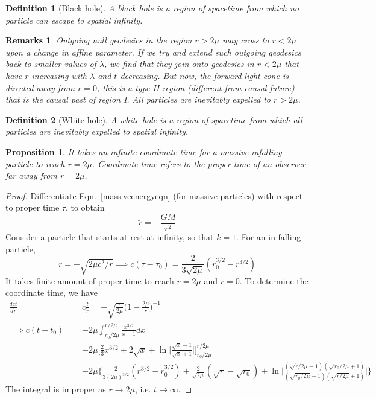 \documentclass[a4paper]{article}
\newtheorem{remarks}{Remarks}[section]
\theoremstyle{new}
\newtheorem{defi}{Definition}[section]
\newtheorem{prop}{Proposition}[section]
\begin{document}
\begin{defi}[Black hole]
A black hole is a region of spacetime from which no particle can escape to spatial infinity.
\end{defi}
\begin{remarks}
Outgoing null geodesics in the region $r>2\mu$ may cross to $r<2\mu$ upon a change in affine parameter. If we try and extend such outgoing geodesics back to smaller values of $\lambda$, we find that they join onto geodesics in $r<2\mu$ that have $r$ increasing with $\lambda$ and $t$ decreasing. But now, the forward light cone is directed away from $r=0$, this is a type II region (different from causal future) that is the causal past of region I. All particles are inevitably expelled to $r>2\mu$.
\end{remarks}
\begin{defi}[White hole]
A white hole is a region of spacetime from which all particles are inevitably expelled to spatial infinity.
\end{defi}
\begin{prop}
It takes an infinite coordinate time for a massive infalling particle to reach $r=2\mu$. Coordinate time refers to the proper time of an observer far away from $r=2\mu$.
\end{prop}
\begin{proof}
Differentiate Eqn.~\ref{massiveenergyeqn} (for massive particles) with respect to proper time $\tau$, to obtain
$$\ddot{r}=-\frac{GM}{r^2}$$
Consider a particle that starts at rest at infinity, so that $k=1$. For an in-falling particle, 
$$\dot{r}=-\sqrt{2\mu c^2/r}\implies c(\tau-\tau_0)=\frac{2}{3\sqrt{2\mu}}(r_0^{3/2}-r^{3/2})$$
It takes finite amount of proper time to reach $r=2\mu$ and $r=0$. To determine the coordinate time, we have
\begin{align}
\frac{dct}{dr}&=c\frac{\dot{t}}{\dot{r}}=-\sqrt{\frac{r}{2\mu}}\bigg(1-\frac{2\mu}{r}\bigg)^{-1}\nonumber\\\implies c(t-t_0)&=-2\mu\int_{r_0/2\mu}^{r/2\mu}\frac{x^{3/2}}{x-1}dx\nonumber\\&=-2\mu\bigg[\frac{2}{3}x^{3/2}+2\sqrt{x}+\ln\bigg|\frac{\sqrt{x}-1}{\sqrt{x}+1}\bigg|\bigg]_{r_0/2\mu}^{r/2\mu}\nonumber\\&=-2\mu\bigg\{\frac{2}{3(2\mu)^{3/2}}(r^{3/2}-r_0^{3/2})+\frac{2}{\sqrt{2\mu}}(\sqrt{r}-\sqrt{r_0})+\ln\bigg|\frac{(\sqrt{r/2\mu}-1)(\sqrt{r_0/2\mu}+1)}{(\sqrt{r_0/2\mu}-1)(\sqrt{r/2\mu}+1)}\bigg|\bigg\}\nonumber
\end{align}
The integral is improper as $r\rightarrow 2\mu$, i.e. $t\rightarrow\infty$. 
\end{proof}
\end{document}
